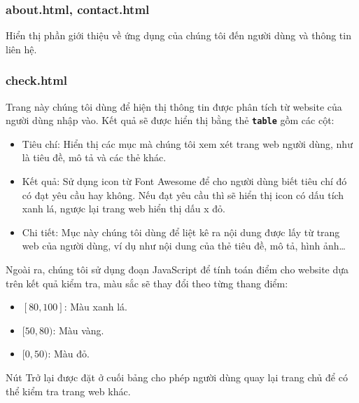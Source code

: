 \subsubsection{about.html, contact.html}
Hiển thị phần giới thiệu về ứng dụng của chúng tôi đến người dùng và thông tin liên hệ.
\subsubsection{check.html}
Trang này chúng tôi dùng để hiện thị thông tin được phân tích từ website của người dùng nhập vào. Kết quả sẽ được hiển thị bằng thẻ \textbf{\texttt{table}} gồm các cột:
\begin{itemize}
	\item Tiêu chí: Hiển thị các mục mà chúng tôi xem xét trang web người dùng, như là tiêu đề, mô tả và các thẻ khác.
	\item Kết quả: Sử dụng icon từ Font Awesome để cho người dùng biết tiêu chí đó có đạt yêu cầu hay không. Nếu đạt yêu cầu thì sẽ hiển thị icon có dấu tích xanh lá, ngược lại trang web hiển thị dấu x đỏ.
	\item Chi tiết: Mục này chúng tôi dùng để liệt kê ra nội dung được lấy từ trang web của người dùng, ví dụ như nội dung của thẻ tiêu đề, mô tả, hình ảnh\ldots
\end{itemize}
\par
Ngoài ra, chúng tôi sử dụng đoạn JavaScript để tính toán điểm cho website dựa trên kết quả kiểm tra, màu sắc sẽ thay đổi theo từng thang điểm:
\begin{itemize}
	\item $[80, 100]$: Màu xanh lá.
	\item $[50, 80)$: Màu vàng.
	\item $[0, 50)$: Màu đỏ.
\end{itemize}
\par
Nút Trở lại được đặt ở cuối bảng cho phép người dùng quay lại trang chủ để có thể kiểm tra trang web khác.